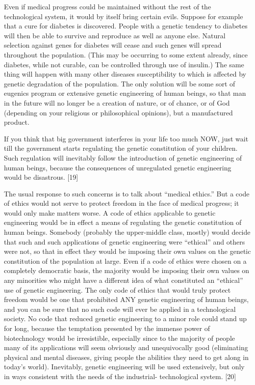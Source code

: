  Even if medical progress could be maintained without the rest of the technological system, it would by itself bring certain evils. Suppose for example that a cure for diabetes is discovered. People with a genetic tendency to diabetes will then be able to survive and reproduce as well as anyone else. Natural selection against genes for diabetes will cease and such genes will spread throughout the population. (This may be occurring to some extent already, since diabetes, while not curable, can be controlled through use of insulin.) The same thing will happen with many other diseases susceptibility to which is affected by genetic degradation of the population. The only solution will be some sort of eugenics program or extensive genetic engineering of human beings, so that man in the future will no longer be a creation of nature, or of chance, or of God (depending on your religious or philosophical opinions), but a manufactured product.

 If you think that big government interferes in your life too much NOW, just wait till the government starts regulating the genetic constitution of your children. Such regulation will inevitably follow the introduction of genetic engineering of human beings, because the consequences of unregulated genetic engineering would be disastrous. [19]

 The usual response to such concerns is to talk about “medical ethics.” But a code of ethics would not serve to protect freedom in the face of medical progress; it would only make matters worse. A code of ethics applicable to genetic engineering would be in effect a means of regulating the genetic constitution of human beings. Somebody (probably the upper-middle class, mostly) would decide that such and such applications of genetic engineering were “ethical” and others were not, so that in effect they would be imposing their own values on the genetic constitution of the population at large. Even if a code of ethics were chosen on a completely democratic basis, the majority would be imposing their own values on any minorities who might have a different idea of what constituted an “ethical” use of genetic engineering. The only code of ethics that would truly protect freedom would be one that prohibited ANY genetic engineering of human beings, and you can be sure that no such code will ever be applied in a technological society. No code that reduced genetic engineering to a minor role could stand up for long, because the temptation presented by the immense power of biotechnology would be irresistible, especially since to the majority of people many of its applications will seem obviously and unequivocally good (eliminating physical and mental diseases, giving people the abilities they need to get along in today’s world). Inevitably, genetic engineering will be used extensively, but only in ways consistent with the needs of the industrial- technological system. [20]

